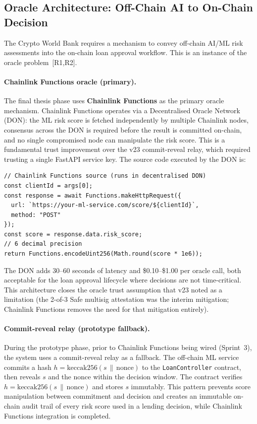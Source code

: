 \documentclass[12pt,a4paper]{report}
\begin{document}
\subsection{Oracle Architecture: Off-Chain AI to On-Chain Decision}
\label{sec:oracle-architecture}

The Crypto World Bank requires a mechanism to convey off-chain AI/ML risk assessments into the on-chain loan approval workflow. This is an instance of the oracle problem~[R1,R2].

\paragraph{Chainlink Functions oracle (primary).}
The final thesis phase uses \textbf{Chainlink Functions} as the primary oracle mechanism. Chainlink Functions operates via a Decentralised Oracle Network (DON): the ML risk score is fetched independently by multiple Chainlink nodes, consensus across the DON is required before the result is committed on-chain, and no single compromised node can manipulate the risk score. This is a fundamental trust improvement over the v23 commit-reveal relay, which required trusting a single FastAPI service key. The source code executed by the DON is:

\begin{verbatim}
// Chainlink Functions source (runs in decentralised DON)
const clientId = args[0];
const response = await Functions.makeHttpRequest({
  url: `https://your-ml-service.com/score/${clientId}`,
  method: "POST"
});
const score = response.data.risk_score;
// 6 decimal precision
return Functions.encodeUint256(Math.round(score * 1e6));
\end{verbatim}

The DON adds 30--60 seconds of latency and \$0.10--\$1.00 per oracle call, both acceptable for the loan approval lifecycle where decisions are not time-critical. This architecture closes the oracle trust assumption that v23 noted as a limitation (the 2-of-3 Safe multisig attestation was the interim mitigation; Chainlink Functions removes the need for that mitigation entirely).

\paragraph{Commit-reveal relay (prototype fallback).}
During the prototype phase, prior to Chainlink Functions being wired (Sprint~3), the system uses a commit-reveal relay as a fallback. The off-chain ML service commits a hash $h = \text{keccak256}(s \,\|\, \text{nonce})$ to the \texttt{LoanController} contract, then reveals $s$ and the nonce within the decision window. The contract verifies $h = \text{keccak256}(s \,\|\, \text{nonce})$ and stores $s$ immutably. This pattern prevents score manipulation between commitment and decision and creates an immutable on-chain audit trail of every risk score used in a lending decision, while Chainlink Functions integration is completed.
\end{document}
